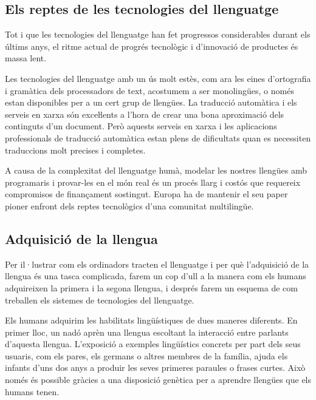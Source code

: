 \begin{multicols}{2}
\subsection{Els reptes de les tecnologies del llenguatge}

Tot i que les tecnologies del llenguatge han fet progressos considerables durant els últims anys, el ritme actual de progrés tecnològic i d’innovació de productes és massa lent.


Les tecnologies del llenguatge amb un ús molt estès, com ara les eines d’ortografia i gramàtica dels processadors de text, acostumem a ser monolingües, o només estan disponibles per a un cert grup de llengües. La traducció automàtica i els serveis en xarxa són exceŀlents a l’hora de crear una bona aproximació dels continguts d’un document. Però aquests serveis en xarxa i les aplicacions professionals de traducció automàtica estan plens de dificultats quan es necessiten traduccions molt precises i completes. 

A causa de la complexitat del llenguatge humà, modelar les nostres llengües amb programaris i provar-les en el món real és un procés llarg i costós que requereix compromisos de finançament sostingut. Europa ha de mantenir el seu paper pioner enfront dels reptes tecnològics d'una comunitat multilingüe.


\subsection{Adquisició de la llengua}

Per il·lustrar com els ordinadors tracten el llenguatge i per què l’adquisició de la llengua és una tasca complicada, farem un cop d’ull a la manera com els humans adquireixen la primera i la segona llengua, i després farem un esquema de com treballen els sistemes de tecnologies del llenguatge.

Els humans adquirim les habilitats lingüístiques de dues maneres diferents. En primer lloc, un nadó aprèn una llengua escoltant la interacció entre parlants d’aquesta llengua. L’exposició a exemples lingüístics concrets per part dels seus usuaris, com els pares, els germans o altres membres de la família, ajuda els infants d’uns dos anys a produir les seves primeres paraules o frases curtes. Això només és possible gràcies a una disposició genètica per a aprendre llengües que els humans tenen.


\end{multicols}
